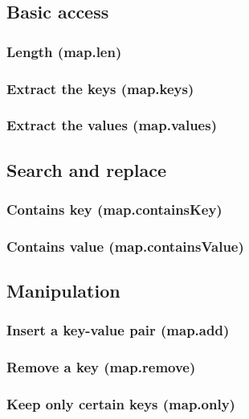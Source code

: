 \documentclass{article}
\theoremstyle{definition}
\begin{document}
\subsection{Basic access}

\subsubsection{Length (map.len)}

\subsubsection{Extract the keys (map.keys)}

\subsubsection{Extract the values (map.values)}

\subsection{Search and replace}

\subsubsection{Contains key (map.containsKey)}

\subsubsection{Contains value (map.containsValue)}

\subsection{Manipulation}

\subsubsection{Insert a key-value pair (map.add)}

\subsubsection{Remove a key (map.remove)}

\subsubsection{Keep only certain keys (map.only)}
\end{document}
